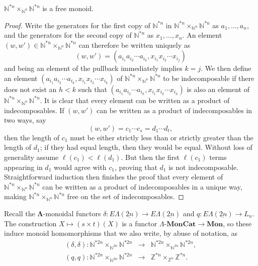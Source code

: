 \documentclass{amsbook} %
\newcommand{\mb}{\mathbf}
\newcommand{\ML}{\mathbf{\Lambda}}
\newcommand{\ELnn}{E\Lambda(\underline{2n})}
\newcommand{\lmc}{\Lambda\mbox{-}\mb{MonCat}}
\newcommand{\mon}{\ensuremath{\mb{Mon}}}
\numberwithin{section}{chapter}
\begin{document}
\begin{lem}\label{freemon} $\mathbb{N}^{\ast n} \times_{\mathbb{N}^n} \mathbb{N}^{\ast n}$ is a free monoid.
\end{lem}
\begin{proof}
Write the generators for the first copy of $\mathbb{N}^{\ast n}$ in $\mathbb{N}^{\ast n} \times_{\mathbb{N}^n} \mathbb{N}^{\ast n}$ as $a_1, \ldots, a_n$, and the generators for the second copy of $\mathbb{N}^{\ast n}$ as $x_1, \ldots, x_n$. An element $(w,w') \in \mathbb{N}^{\ast n} \times_{\mathbb{N}^n} \mathbb{N}^{\ast n}$ can therefore be written uniquely as
\[
(w,w') = (a_{i_1} a_{i_2} \cdots a_{i_k}, x_{i_1} x_{i_2} \cdots x_{i_j})
\]
and being an element of the pullback immediately implies $k=j$. We then define an element $ (a_{i_1} a_{i_2} \cdots a_{i_k}, x_{i_1} x_{i_2} \cdots x_{i_k})$ of $\mathbb{N}^{\ast n} \times_{\mathbb{N}^n} \mathbb{N}^{\ast n}$ to be indecomposable if there does not exist an $h < k$ such that $ (a_{i_1} a_{i_2} \cdots a_{i_h}, x_{i_1} x_{i_2} \cdots x_{i_h})$ is also an element of $\mathbb{N}^{\ast n} \times_{\mathbb{N}^n} \mathbb{N}^{\ast n}$. It is clear that every element can be written as a product of indecomposables. If $(w,w')$ can be written as a product of indecomposables in two ways, say 
\[
(w,w') = c_1 \cdots c_s = d_1 \cdots d_t,
\]
then the length  of $c_1$ must be either strictly less than or strictly greater than the length of $d_1$; if they had equal length, then they would be equal. Without loss of generality assume $\ell(c_1) < \ell(d_1)$. But then the first $\ell(c_1)$ terms appearing in $d_1$ would agree with $c_1$, proving that $d_1$ is not indecomposable. Straightforward induction then finishes the proof that every element of $\mathbb{N}^{\ast n} \times_{\mathbb{N}^n} \mathbb{N}^{\ast n}$ can be written as a product of indecomposables in a unique way, making $\mathbb{N}^{\ast n} \times_{\mathbb{N}^n} \mathbb{N}^{\ast n}$ free on the set of indecomposables.
\end{proof}

Recall the $\ML$-monoidal functors $\delta \colon \ELnn \to \ELnn$ and $q \colon \ELnn \to L_n$. The construction $X \mapsto (s \times t)(X)$ is a functor $\lmc \to \mon$, so these induce monoid homomorphisms that we also write, by abuse of notation, as 
\[
\begin{array}{rcl}
(\delta, \delta) \colon  \mathbb{N}^{\ast 2n} \times_{\mathbb{N}^{2n}} \mathbb{N}^{\ast 2n} & \to & \mathbb{N}^{\ast 2n} \times_{\mathbb{N}^{2n}} \mathbb{N}^{\ast 2n}, \\
(q, q) \colon  \mathbb{N}^{\ast 2n} \times_{\mathbb{N}^{2n}} \mathbb{N}^{\ast 2n} & \to & \mathbb{Z}^{\ast n} \times_{\mathbb{Z}^n} \mathbb{Z}^{\ast n}. 
\end{array}
\]
\end{document}
